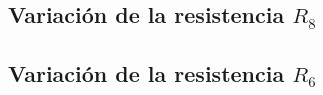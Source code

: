 \subsection{Variaci\'on de la resistencia $R_8$}


\subsection{Variaci\'on de la resistencia $R_6$}

